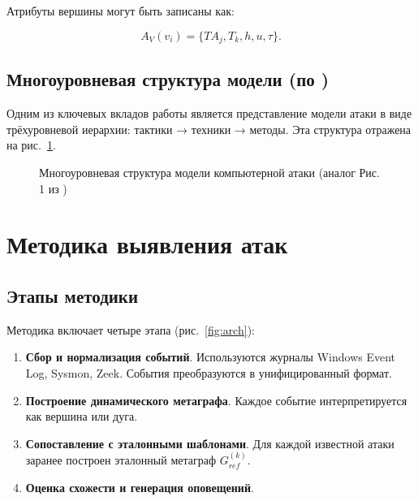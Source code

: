 \documentclass[12pt,a4paper]{article}
\begin{document}
Атрибуты вершины могут быть записаны как:

\begin{equation}
A_V(v_i) = \{ TA_j, T_k, h, u, \tau \}.
\end{equation}

\subsection{Многоуровневая структура модели (по \cite{latypov2020})}

Одним из ключевых вкладов работы \cite{latypov2020} является представление модели атаки в виде трёхуровневой иерархии: тактики → техники → методы. Эта структура отражена на рис.~\ref{fig:levels}.

\begin{figure}[ht]
\centering
{}
\caption{Многоуровневая структура модели компьютерной атаки (аналог Рис. 1 из \cite{latypov2020})}
\label{fig:levels}
\end{figure}

\section{Методика выявления атак}

\subsection{Этапы методики}

Методика включает четыре этапа (рис.~\ref{fig:arch}):

\begin{enumerate}[leftmargin=*,noitemsep]
    \item \textbf{Сбор и нормализация событий}. Используются журналы Windows Event Log, Sysmon, Zeek. События преобразуются в унифицированный формат.
    \item \textbf{Построение динамического метаграфа}. Каждое событие интерпретируется как вершина или дуга.
    \item \textbf{Сопоставление с эталонными шаблонами}. Для каждой известной атаки заранее построен эталонный метаграф $G_{ref}^{(k)}$.
    \item \textbf{Оценка схожести и генерация оповещений}.
\end{enumerate}
\end{document}
